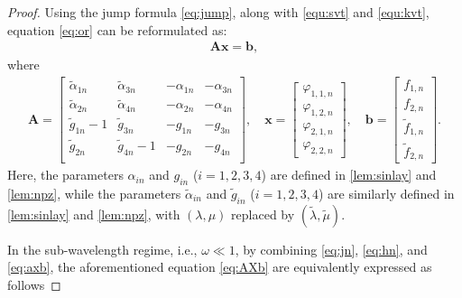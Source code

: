 \documentclass[10pt,a4paper]{amsart}
\begin{document}
\begin{proof}
	Using the jump formula \eqref{eq:jump}, along with \eqref{equ:svt} and \eqref{equ:kvt}, equation \eqref{eq:or} can be reformulated as:
	\begin{align}\label{eq:AXb}\bm{Ax}=\bm{b},\end{align}
	where
	\begin{align}\label{eq:axb}
		\bm{A}=\begin{bmatrix}
			\tilde{\alpha}_{1n} & \tilde{\alpha}_{3n} & -\alpha_{1n} & -\alpha_{3n} \\
			\tilde{\alpha}_{2n} & \tilde{\alpha}_{4n} & -\alpha_{2n} & -\alpha_{4n} \\
			\tilde{g}_{1n}-1 & \tilde{g}_{3n} & -g_{1n} & -g_{3n} \\
			\tilde{g}_{2n} & \tilde{g}_{4n}-1 & -g_{2n} & -g_{4n} \\
		\end{bmatrix},\quad
		\bm{x}=\begin{bmatrix}\varphi _{1,1,n} 
			\\\varphi _{1,2,n} 
			\\\varphi _{2,1,n} 
			\\\varphi _{2,2,n} 		
		\end{bmatrix},
		\quad
		\bm{b}=\begin{bmatrix}f _{1,n} 
			\\f _{2,n}  
			\\\tilde{f}_{1,n} 
			\\\tilde{f}_{2,n}  
		\end{bmatrix}.
	\end{align}
	Here, the parameters $\alpha_{in}$ and $g_{in}$ ($i = 1, 2, 3, 4$) are defined in \eqref{lem:sinlay} and \eqref{lem:npz}, while the parameters $\tilde{\alpha}_{in} $ and $\tilde{g}_{in}$  ($i = 1, 2, 3, 4$) are similarly defined in \eqref{lem:sinlay} and \eqref{lem:npz}, with $(\lambda, \mu)$ replaced by $(\tilde{\lambda}, \tilde{\mu})$.
	
	In the sub-wavelength regime, i.e., $\omega \ll 1$, by combining \eqref{eq:jn}, \eqref{eq:hn}, and \eqref{eq:axb}, the aforementioned equation \eqref{eq:AXb} are equivalently expressed as follows
	

\end{proof}
\end{document}
